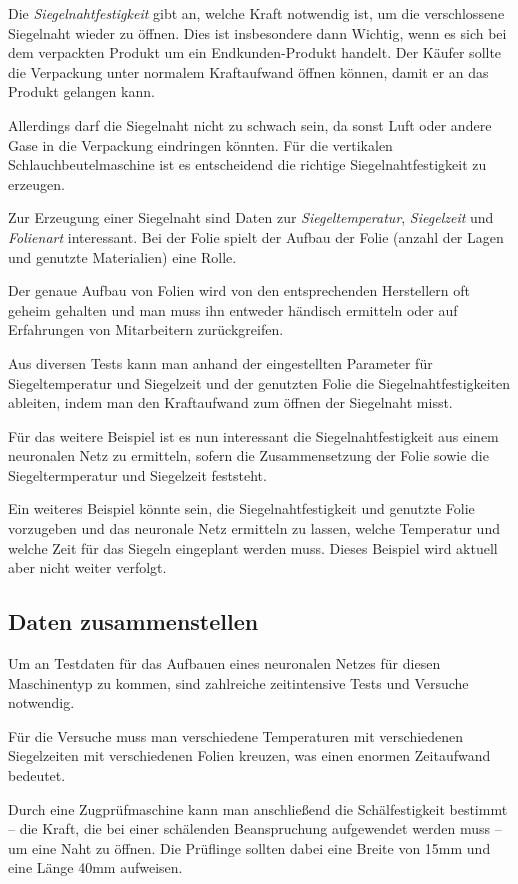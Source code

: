 Die \textit{Siegelnahtfestigkeit} gibt an, welche Kraft notwendig ist, um die verschlossene Siegelnaht wieder zu öffnen.
Dies ist insbesondere dann Wichtig, wenn es sich bei dem verpackten Produkt um ein Endkunden-Produkt handelt. Der Käufer
sollte die Verpackung unter normalem Kraftaufwand öffnen können, damit er an das Produkt gelangen kann.

Allerdings darf die Siegelnaht nicht zu schwach sein, da sonst Luft oder andere Gase in die Verpackung eindringen
könnten. Für die vertikalen Schlauchbeutelmaschine ist es entscheidend die richtige Siegelnahtfestigkeit zu erzeugen.

Zur Erzeugung einer Siegelnaht sind Daten zur \textit{Siegeltemperatur}, \textit{Siegelzeit} und \textit{Folienart}
interessant. Bei der Folie spielt der Aufbau der Folie (anzahl der Lagen und genutzte Materialien) eine Rolle.

Der genaue Aufbau von Folien wird von den entsprechenden Herstellern oft geheim gehalten und man muss ihn entweder
händisch ermitteln oder auf Erfahrungen von Mitarbeitern zurückgreifen.

Aus diversen Tests kann man anhand der eingestellten Parameter für Siegeltemperatur und Siegelzeit und der genutzten
Folie die Siegelnahtfestigkeiten ableiten, indem man den Kraftaufwand zum öffnen der Siegelnaht misst.

Für das weitere Beispiel ist es nun interessant die Siegelnahtfestigkeit aus einem neuronalen Netz zu ermitteln, sofern
die Zusammensetzung der Folie sowie die Siegeltermperatur und Siegelzeit feststeht.

Ein weiteres Beispiel könnte sein, die Siegelnahtfestigkeit und genutzte Folie vorzugeben und das neuronale Netz
ermitteln zu lassen, welche Temperatur und welche Zeit für das Siegeln eingeplant werden muss. Dieses Beispiel wird
aktuell aber nicht weiter verfolgt.

\subsection{Daten zusammenstellen}
Um an Testdaten für das Aufbauen eines neuronalen Netzes für diesen Maschinentyp zu kommen, sind zahlreiche
zeitintensive Tests und Versuche notwendig.

Für die Versuche muss man verschiedene Temperaturen mit verschiedenen Siegelzeiten mit verschiedenen Folien kreuzen, was
einen enormen Zeitaufwand bedeutet.

Durch eine Zugprüfmaschine kann man anschließend die Schälfestigkeit bestimmt -- die Kraft, die bei einer schälenden
Beanspruchung aufgewendet werden muss -- um eine Naht zu öffnen. Die Prüflinge sollten dabei eine Breite von 15mm und
eine Länge 40mm aufweisen.

